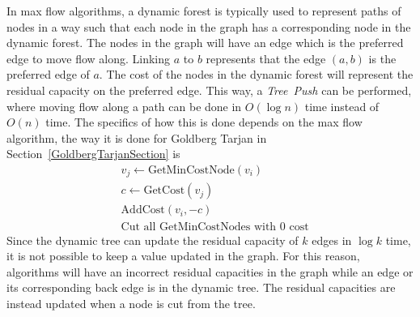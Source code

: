 In max flow algorithms, a dynamic forest is typically used to represent paths of nodes in a way such that each node in the graph has a corresponding node in the dynamic forest.
The nodes in the graph will have an edge which is the preferred edge to move flow along. Linking $a$ to $b$ represents that the edge $(a, b)$ is the preferred edge of $a$.
The cost of the nodes in the dynamic forest will represent the residual capacity on the preferred edge.
This way, a \emph{Tree~Push} can be performed, where moving flow along a path can be done in $O(\log n)$ time instead of $O(n)$ time.
The specifics of how this is done depends on the max flow algorithm, the way it is done for Goldberg Tarjan in Section~\ref{GoldbergTarjanSection} is
\begin{align*}
&v_j \gets \mathrm{GetMinCostNode}(v_i)\\
&c \gets \mathrm{GetCost}(v_j)\\
& \mathrm{AddCost}(v_i, -c)\\
& \text{Cut all GetMinCostNodes with 0 cost}
\end{align*} 
Since the dynamic tree can update the residual capacity of $k$ edges in $\log k$ time, it is not possible to keep a value updated in the graph.
For this reason, algorithms will have an incorrect residual capacities in the graph while an edge or its corresponding back edge is in the dynamic tree. 
The residual capacities are instead updated when a node is cut from the tree.
